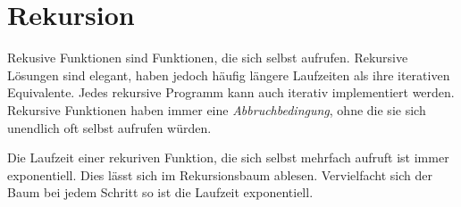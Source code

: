 \documentclass{article}
\begin{document}
\section*{Rekursion}
Rekusive Funktionen sind Funktionen, die sich selbst aufrufen. Rekursive Lösungen sind
elegant, haben jedoch häufig längere Laufzeiten als ihre iterativen Equivalente. Jedes
rekursive Programm kann auch iterativ implementiert werden. Rekursive Funktionen haben 
immer eine \emph{Abbruchbedingung}, ohne die sie sich unendlich oft selbst aufrufen würden.

Die Laufzeit einer rekuriven Funktion, die sich selbst mehrfach aufruft ist immer exponentiell.
Dies lässt sich im Rekursionsbaum ablesen. Vervielfacht sich der Baum bei jedem Schritt so ist
die Laufzeit exponentiell.
\end{document}
